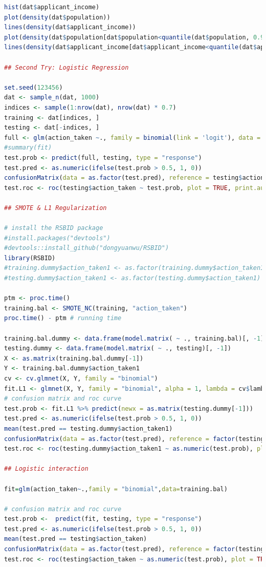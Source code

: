 \documentclass{jpp}
\begin{document}
\begin{lstlisting}[language=R]
hist(dat$applicant_income)
plot(density(dat$population))
lines(density(dat$applicant_income))
plot(density(dat$population[dat$population<quantile(dat$population, 0.99)]))
lines(density(dat$applicant_income[dat$applicant_income<quantile(dat$applicant_income, 0.99)]))

## Second Try: Logistic Regression

set.seed(123456)
dat <- sample_n(dat, 1000)
indices <- sample(1:nrow(dat), nrow(dat) * 0.7)
training <- dat[indices, ]
testing <- dat[-indices, ]
full <- glm(action_taken ~., family = binomial(link = 'logit'), data = training)
#summary(fit)
test.prob <- predict(full, testing, type = "response")
test.pred <- as.numeric(ifelse(test.prob > 0.5, 1, 0))
confusionMatrix(data = as.factor(test.pred), reference = testing$action_taken, positive = "1")
test.roc <- roc(testing$action_taken ~ test.prob, plot = TRUE, print.auc = TRUE)

## SMOTE & L1 Regularization

# install the RSBID package
#install.packages("devtools")
#devtools::install_github("dongyuanwu/RSBID")
library(RSBID)
#training.dummy$action_taken1 <- as.factor(training.dummy$action_taken1)
#testing.dummy$action_taken1 <- as.factor(testing.dummy$action_taken1)

ptm <- proc.time()
training.bal <- SMOTE_NC(training, "action_taken")
proc.time() - ptm # running time

training.bal.dummy <- data.frame(model.matrix( ~ ., training.bal)[, -1])
testing.dummy <- data.frame(model.matrix( ~ ., testing)[, -1])
X <- as.matrix(training.bal.dummy[-1])
Y <- training.bal.dummy$action_taken1
cv <- cv.glmnet(X, Y, family = "binomial")
fit.L1 <- glmnet(X, Y, family = "binomial", alpha = 1, lambda = cv$lambda.min)
# confusion matrix and roc curve
test.prob <- fit.L1 %>% predict(newx = as.matrix(testing.dummy[-1]))
test.pred <- as.numeric(ifelse(test.prob > 0.5, 1, 0))
mean(test.pred == testing.dummy$action_taken1)
confusionMatrix(data = as.factor(test.pred), reference = factor(testing.dummy$action_taken1), positive = "1")
test.roc <- roc(testing.dummy$action_taken1 ~ as.numeric(test.prob), plot = TRUE, print.auc = TRUE)

## Logistic interaction

fit=glm(action_taken~.,family = "binomial",data=training.bal)

# confusion matrix and roc curve
test.prob <-  predict(fit, testing, type = "response")
test.pred <- as.numeric(ifelse(test.prob > 0.5, 1, 0))
mean(test.pred == testing$action_taken)
confusionMatrix(data = as.factor(test.pred), reference = factor(testing$action_taken), positive = "1")
test.roc <- roc(testing$action_taken ~ as.numeric(test.prob), plot = TRUE, print.auc = TRUE)


\end{lstlisting}
\end{document}
